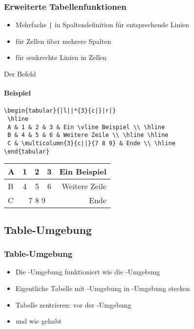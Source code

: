 \begin{frame}[fragile]
\frametitle{Erweiterte Tabellenfunktionen}
\begin{itemize}
    \item Mehrfache \verb+|+ in Spaltendefinition für entsprechende Linien
    \item {} für Zellen über mehrere Spalten
    \item {} für senkrechte Linien in Zellen
\end{itemize}

\end{frame}
\begin{frame}[fragile]{Der Befehl }
\framesubtitle{Beispiel}
\begin{codeblock}
\begin{verbatim}  
\begin{tabular}{|l||*{3}{c|}|r|}
 \hline
 A & 1 & 2 & 3 & Ein \vline Beispiel \\ \hline
 B & 4 & 5 & 6 & Weitere Zeile \\ \hline \hline
 C & \multicolumn{3}{c||}{7 8 9} & Ende \\ \hline
\end{tabular}
\end{verbatim}
\end{codeblock}\pause
\begin{table}
\center
  \begin{tabular}{|l||*{3}{c|}|r|}
   \hline
    A & 1 & 2 & 3 & Ein \vline Beispiel \\\hline
    B & 4 & 5 & 6 & Weitere Zeile \\\hline \hline
    C & \multicolumn{3}{c||}{7 8 9} & Ende \\\hline
  \end{tabular}
  \end{table}
\end{frame}


\subsection{Table-Umgebung}
\begin{frame}[fragile]
\frametitle{Table-Umgebung}
\begin{itemize}
    \item Die -Umgebung funktioniert wie die -Umgebung\pause
    \item Eigentliche Tabelle mit -Umgebung in -Umgebung
        stecken\pause
    \item Tabelle zentrieren:  vor der -Umgebung\pause
    \item {} und  wie gehabt
\end{itemize}

\end{frame}
